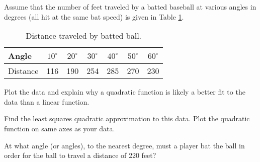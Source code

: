 \item Assume that the number of feet traveled by a batted baseball at various angles in degrees (all hit at the same bat speed) is given in Table \ref{T:7_d_batting}.
\begin{table}[h]
\begin{center}
\begin{tabular}{|l||c|c|c|c|c|c|} \hline
Angle			&$10^{\circ}$	&$20^{\circ}$	&$30^{\circ}$	&$40^{\circ}$	&$50^{\circ}$	&$60^{\circ}$ \\ \hline
Distance		&116					&190					&254					&285					&270					&230  \\ \hline
\end{tabular}
\end{center}
\caption{Distance traveled by batted ball.}
\label{T:7_d_batting}
\end{table}
	\ba
	\item Plot the data and explain why a quadratic function is likely a better fit to the data than a linear function.
	\item Find the least squares quadratic approximation to this data. Plot the quadratic function on same axes as your data.
	\item At what angle (or angles), to the nearest degree, must a player bat the ball in order for the ball to travel a distance of 220 feet?
	\ea


